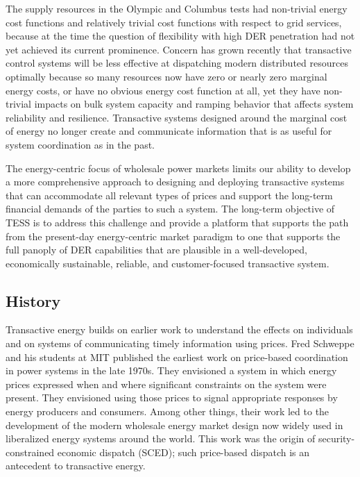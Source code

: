 \documentclass[10pt,twocolumn]{article}
\begin{document}
The supply resources in the Olympic and Columbus tests had non-trivial energy cost functions and relatively trivial cost functions with respect to grid services, because at the time the question of flexibility with high DER penetration had not yet achieved its current prominence.  Concern has grown recently that transactive control systems will be less effective at dispatching modern distributed resources optimally because so many resources now have zero or nearly zero marginal energy costs, or have no obvious energy cost function at all, yet they have non-trivial impacts on bulk system capacity and ramping behavior that affects system reliability and resilience. Transactive systems designed around the marginal cost of energy no longer create and communicate information that is as useful for system coordination as in the past. 

The energy-centric focus of wholesale power markets limits our ability to develop a more comprehensive approach to designing and deploying transactive systems that can accommodate all relevant types of prices and support the long-term financial demands of the parties to such a system. The long-term objective of TESS is to address this challenge and provide a platform that supports the path from the present-day energy-centric market paradigm to one that supports the full panoply of DER capabilities that are plausible in a well-developed, economically sustainable, reliable, and customer-focused transactive system.

\subsection{History}

Transactive energy builds on earlier work to understand the effects on individuals and on systems of communicating timely information using prices. Fred Schweppe and his students at MIT \cite{schweppe1978} published the earliest work on price-based coordination in power systems in the late 1970s.  They envisioned a system in which energy prices expressed when and where significant constraints on the system were present. They envisioned using those prices to signal appropriate responses by energy producers and consumers. Among other things, their work led to the development of the modern wholesale energy market design now widely used in liberalized energy systems around the world. This work was the origin of security-constrained economic dispatch (SCED); such price-based dispatch is an antecedent to transactive energy.
\end{document}
